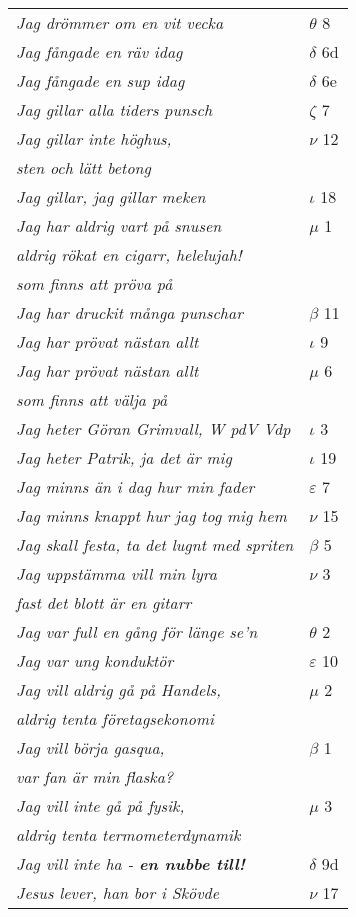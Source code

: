 \documentclass[a6paper,10pt]{article}
\begin{document}
\newpage
\begin{table}[!h]
\begin{tabular}{l l}
\textit{Jag drömmer om en vit vecka}	&$\theta$ 8\\
\textit{Jag fångade en räv idag}	&$\delta$ 6d\\
\textit{Jag fångade en sup idag}	&$\delta$ 6e\\
\textit{Jag gillar alla tiders punsch}	&$\zeta$ 7\\
\textit{Jag gillar inte höghus,}	&$\nu$ 12\\
\textit{sten och lätt betong} &\\
\textit{Jag gillar, jag gillar meken} &$\iota$ 18\\
\textit{Jag har aldrig vart på snusen}	&$\mu$ 1\\
\textit{aldrig rökat en cigarr, helelujah!} &\\
\textit{som finns att pröva på} &\\
\textit{Jag har druckit många punschar}	&$\beta$ 11\\
\textit{Jag har prövat nästan allt}	&$\iota$ 9\\
\textit{Jag har prövat nästan allt }	&$\mu$ 6\\
\textit{som finns att välja på} &\\
\textit{Jag heter Göran Grimvall, W pdV Vdp}	&$\iota$ 3\\
\textit{Jag heter Patrik, ja det är mig}&$\iota$ 19\\
\textit{Jag minns än i dag hur min fader}	&$\varepsilon$ 7\\
\textit{Jag minns knappt hur jag tog mig hem}	&$\nu$ 15\\
\textit{Jag skall festa, ta det lugnt med spriten}	&$\beta$ 5\\
\textit{Jag uppstämma vill min lyra}	&$\nu$ 3\\
\textit{fast det blott är en gitarr} &\\
\textit{Jag var full en gång för länge se'n}	&$\theta$ 2\\
\textit{Jag var ung konduktör}	&$\varepsilon$ 10\\
\textit{Jag vill aldrig gå på Handels,}	&$\mu$ 2\\
\textit{aldrig tenta företagsekonomi} &\\
\textit{Jag vill börja gasqua,}	&$\beta$ 1\\
\textit{var fan är min flaska?} &\\
\textit{Jag vill inte gå på fysik,}	&$\mu$ 3\\
\textit{aldrig tenta termometerdynamik} &\\
\textit{Jag vill inte ha - \textbf{en nubbe till!}}	&$\delta$ 9d\\
\textit{Jesus lever, han bor i Skövde} &$\nu$ 17\\
\end{tabular}
\end{table}
\end{document}
